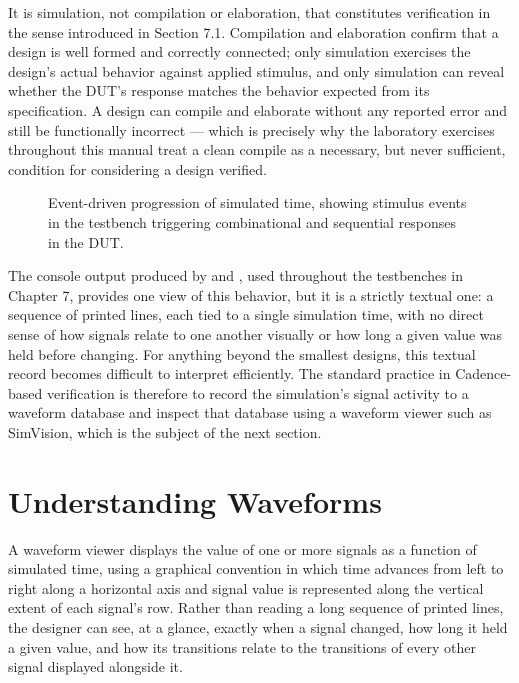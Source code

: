 It is simulation, not compilation or elaboration, that constitutes verification in the sense introduced in Section 7.1. Compilation and elaboration confirm that a design is well formed and correctly connected; only simulation exercises the design's actual behavior against applied stimulus, and only simulation can reveal whether the DUT's response matches the behavior expected from its specification. A design can compile and elaborate without any reported error and still be functionally incorrect --- which is precisely why the laboratory exercises throughout this manual treat a clean compile as a necessary, but never sufficient, condition for considering a design verified.


\begin{figure}[h]
\centering
\caption{Event-driven progression of simulated time, showing stimulus events in the testbench triggering combinational and sequential responses in the DUT.}
\label{fig:simulation_flow}
\end{figure}

The console output produced by  and , used throughout the testbenches in Chapter 7, provides one view of this behavior, but it is a strictly textual one: a sequence of printed lines, each tied to a single simulation time, with no direct sense of how signals relate to one another visually or how long a given value was held before changing. For anything beyond the smallest designs, this textual record becomes difficult to interpret efficiently. The standard practice in Cadence-based verification is therefore to record the simulation's signal activity to a waveform database and inspect that database using a waveform viewer such as SimVision, which is the subject of the next section.

\section{Understanding Waveforms}

A waveform viewer displays the value of one or more signals as a function of simulated time, using a graphical convention in which time advances from left to right along a horizontal axis and signal value is represented along the vertical extent of each signal's row. Rather than reading a long sequence of printed  lines, the designer can see, at a glance, exactly when a signal changed, how long it held a given value, and how its transitions relate to the transitions of every other signal displayed alongside it.\\

